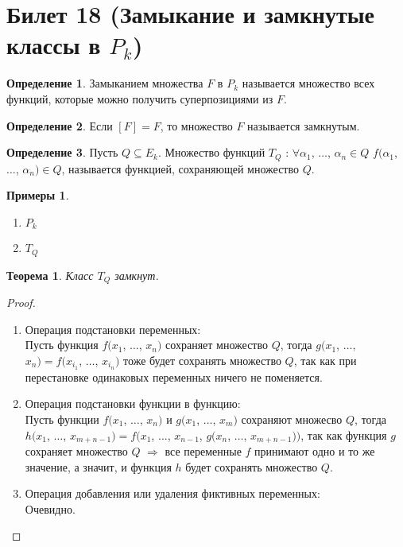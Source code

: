 \documentclass[a4paper, 12pt]{article}
\theoremstyle{definition}
\newtheorem*{definition}{Определение}
\newtheorem*{example}{Примеры}
\theoremstyle{plain}
\newtheorem*{theorem}{Теорема}
\theoremstyle{remark}
\begin{document}
  \section{Билет 18 (Замыкание и замкнутые классы в $P_k$)}
  \begin{definition}
    Замыканием множества $F$ в $P_k$ называется множество всех функций, которые можно получить суперпозициями из $F$.
  \end{definition}
  \begin{definition}
    Если $[F]=F$, то множество $F$ называется замкнутым.
  \end{definition}
  \begin{definition}
    Пусть $Q\subseteq E_k$. Множество функций $T_Q$ : $\forall \alpha_1$, $\ldots$, $\alpha_n\in Q$ $f(\alpha_1$, $\ldots$, $\alpha_n)\in Q$, называется функцией, сохраняющей множество $Q$.
  \end{definition}
  \begin{example}
    \begin{enumerate}
      \item $P_k$
      \item $T_Q$
    \end{enumerate}
  \end{example}
  \begin{theorem}
    Класс $T_Q$ замкнут.
  \end{theorem}
  \begin{proof}
    \begin{enumerate}
      \item Операция подстановки переменных:\\
      Пусть функция $f(x_1$, $\ldots$, $x_n)$ сохраняет множество $Q$, тогда $g(x_1$, $\ldots$, $x_n)=f(x_{i_1}$, $\ldots$, $x_{i_n})$ тоже будет сохранять множество $Q$, так как при перестановке одинаковых переменных ничего не поменяется.
      \item Операция подстановки функции в функцию:\\
      Пусть функции $f(x_1$, $\ldots$, $x_n)$ и $g(x_1$, $\ldots$, $x_m)$ сохраняют множесво $Q$, тогда $h(x_1$, $\ldots$, $x_{m+n-1})=f(x_1$, $\ldots$, $x_{n-1}$, $g(x_n$, $\ldots$, $x_{m+n-1}))$, так как функция $g$ сохраняет множество $Q$ $\Longrightarrow$ все переменные $f$ принимают одно и то же значение, а значит, и функция $h$ будет сохранять множество $Q$.
      \item Операция добавления или удаления фиктивных переменных:\\
      Очевидно.
    \end{enumerate}
  \end{proof}
\end{document}
